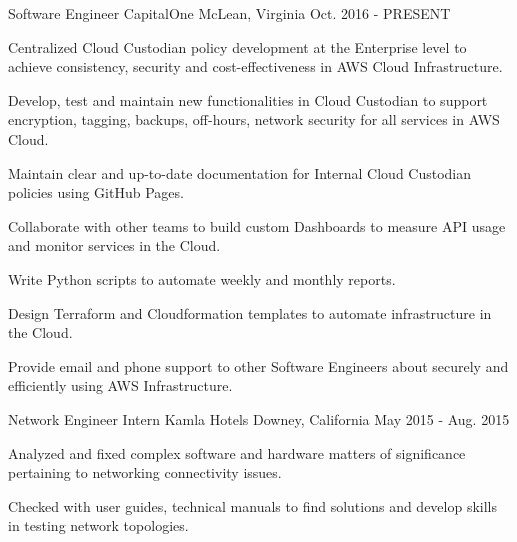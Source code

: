 

\begin{cventries}

  \cventry
    {Software Engineer} %
    {CapitalOne} %
    {McLean, Virginia} %
    {Oct. 2016 - PRESENT} %
    {
      \begin{cvitems} %
        \item {Centralized Cloud Custodian policy development at the Enterprise level to achieve consistency, security and cost-effectiveness in AWS Cloud Infrastructure.}
        \item {Develop, test and maintain new functionalities in Cloud Custodian to support encryption, tagging, backups, off-hours, network security for all services in AWS Cloud.}
        \item {Maintain clear and up-to-date documentation for Internal Cloud Custodian policies using GitHub Pages.}
        \item {Collaborate with other teams to build custom Dashboards to measure API usage and monitor services in the Cloud.}
        \item {Write Python scripts to automate weekly and monthly reports.}
        \item {Design Terraform and Cloudformation templates to automate infrastructure in the Cloud.}
        \item {Provide email and phone support to other Software Engineers about securely and efficiently using AWS Infrastructure.}
      \end{cvitems}
    }

  \cventry
    {Network Engineer Intern} %
    {Kamla Hotels} %
    {Downey, California} %
    {May 2015 - Aug. 2015} %
    {
      \begin{cvitems} %
        \item {Analyzed and fixed complex software and hardware matters of significance pertaining to networking connectivity issues.}
        \item {Checked with user guides, technical manuals to find solutions and develop skills in testing network topologies. }
      \end{cvitems}
    }

\end{cventries}
